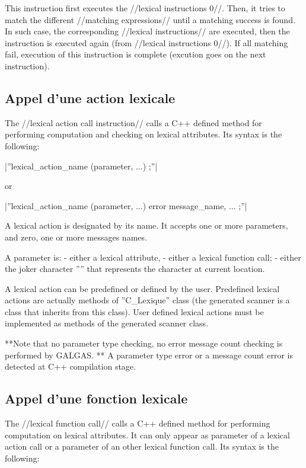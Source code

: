 This instruction first executes the //lexical instructions 0//. Then, it tries to match the different //matching expressions// until a matching success is found. In such case, the corresponding //lexical instructions// are executed, then the instruction is executed again (from //lexical instructions 0//). If all matching fail, execution of this instruction is complete (excution goes on the next instruction).

\subsection{Appel d'une action lexicale}

The //lexical action call instruction// calls a C++ defined method for performing computation and checking on lexical attributes. Its syntax is the following:

|''lexical\_action\_name (parameter, ...) ;''|

or

|''lexical\_action\_name (parameter, ...) error message\_name, ... ;''|

A lexical action is designated by its name. It accepts one or more parameters, and zero, one or more messages names.

A parameter is:
  - either a lexical attribute,
  - either a lexical function call;
  - either the joker character ''\textquotesingle*\textquotesingle'' that represents the character at current location.

A lexical action can be predefined or defined by the user. Predefined lexical actions are actually methods of ''C\_Lexique'' class (the generated scanner is a class that inherits from this class). User defined lexical actions must be implemented as methods of the generated scanner class.

**Note that no parameter type checking, no error message count checking is performed by GALGAS. ** A parameter type error or a message count error is detected at C++ compilation stage.

\subsection{Appel d'une fonction lexicale}

The //lexical function call// calls a C++ defined method for performing computation on lexical attributes. It can only appear as parameter of a lexical action call or a parameter of an other lexical function call. Its syntax is the following:

